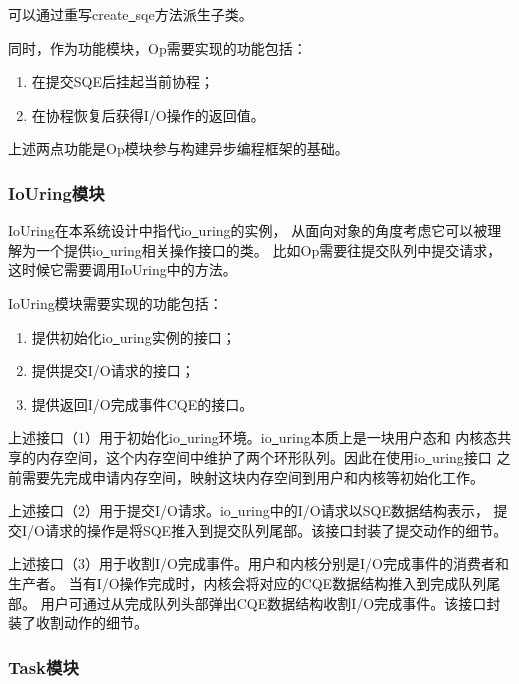 \documentclass[supercite]{HustGraduPaper}
\theoremstyle{definition}
\begin{document}
可以通过重写create\underline{~}sqe方法派生子类。\par

同时，作为功能模块，Op需要实现的功能包括：

\begin{enumerate}
  \item 在提交SQE后挂起当前协程；
  \item 在协程恢复后获得I/O操作的返回值。
\end{enumerate}

上述两点功能是Op模块参与构建异步编程框架的基础。\par

\subsubsection{IoUring模块}

IoUring在本系统设计中指代io\underline{~}uring的实例，
从面向对象的角度考虑它可以被理解为一个提供io\underline{~}uring相关操作接口的类。
比如Op需要往提交队列中提交请求，这时候它需要调用IoUring中的方法。\par

IoUring模块需要实现的功能包括：

\begin{enumerate}
  \item 提供初始化io\underline{~}uring实例的接口；
  \item 提供提交I/O请求的接口；
  \item 提供返回I/O完成事件CQE的接口。
\end{enumerate}

上述接口（1）用于初始化io\underline{~}uring环境。io\underline{~}uring本质上是一块用户态和
内核态共享的内存空间，这个内存空间中维护了两个环形队列。因此在使用io\underline{~}uring接口
之前需要先完成申请内存空间，映射这块内存空间到用户和内核等初始化工作。\par

上述接口（2）用于提交I/O请求。io\underline{~}uring中的I/O请求以SQE数据结构表示，
提交I/O请求的操作是将SQE推入到提交队列尾部。该接口封装了提交动作的细节。\par

上述接口（3）用于收割I/O完成事件。用户和内核分别是I/O完成事件的消费者和生产者。
当有I/O操作完成时，内核会将对应的CQE数据结构推入到完成队列尾部。
用户可通过从完成队列头部弹出CQE数据结构收割I/O完成事件。该接口封装了收割动作的细节。\par

\subsubsection{Task模块}
\end{document}
